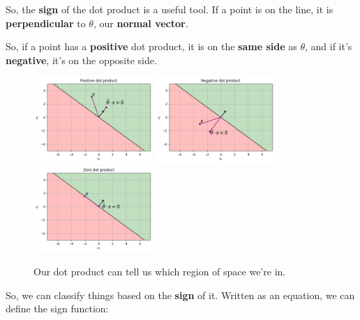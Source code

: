         So, the \textbf{sign} of the dot product is a useful tool. If a point is on the line, it is \textbf{perpendicular} to $\theta$, our \textbf{normal vector}.
        
        So, if a point has a \textbf{positive} dot product, it is on the \textbf{same side} as $\theta$, and if it's \textbf{negative}, it's on the opposite side.
        
        \begin{figure}[H]
                
                \includegraphics[width=45mm,scale=0.3]{images/classification_images/positive_v_vector_theta_hat.png}
                \includegraphics[width=45mm,scale=0.3]{images/classification_images/negative_v_vector_theta_hat.png}
                \includegraphics[width=45mm,scale=0.3]{images/classification_images/zero_v_vector_theta_hat.png}
                
                \caption*{Our dot product can tell us which region of space we're in.}
        \end{figure}        
        
        So, we can classify things based on the \textbf{sign} of it. Written as an equation, we can define the sign function:\\
        
